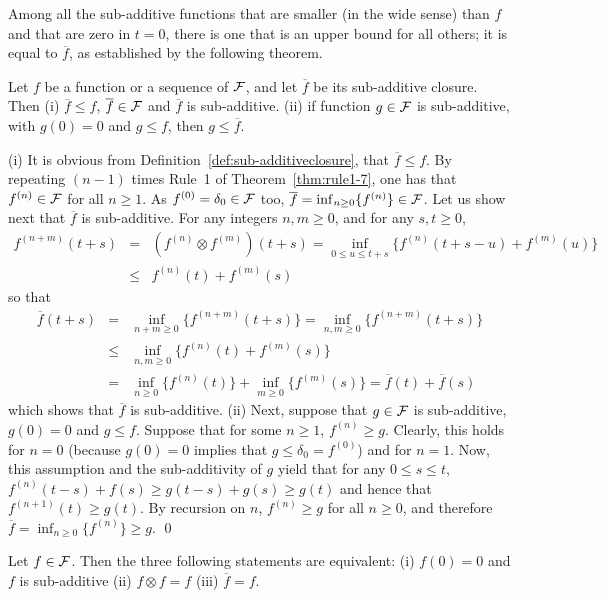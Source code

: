 Among all the sub-additive functions that are smaller (in the wide sense) than $f$ and
that are zero in $t=0$, there is one that is an upper bound for
all others; it is equal to $\overline{f}$, as established by the
following theorem.
\begin{theorem}
Let $f$ be a function or a sequence of $\mathcal F$, and let $\overline{f}$ be its sub-additive closure.
Then
\noindent
(i)  $\overline{f} \leq f$, $\overline{f} \in \mathcal F$ and $\overline{f}$ is sub-additive.
\noindent
(ii) if function $g \in \mathcal F$ is sub-additive, with $g(0) = 0$ and $g \leq f$, then $g \leq \overline{f}$.
\end{theorem}
\pr (i) It is obvious from Definition~\ref{def:sub-additiveclosure}, that $\overline{f} \leq f$. By repeating
$(n-1)$ times Rule~1 of Theorem~\ref{thm:rule1-7}, one has that $f^{(n)} \in \mathcal F$ for all $n \geq 1$.
As $f^{(0)}  = \delta_0 \in \mathcal F$ too, $\overline{f} = \inf_{n \geq 0} \{ f^{(n)} \} \in \mathcal F$.
Let us show next that $\overline{f}$ is sub-additive. For any integers $n,m \geq 0$, and for any $s,t \geq 0$,
\begin{eqnarray*}
f^{(n+m)}(t+s) & = & (f^{(n)} \otimes f^{(m)})(t+s) = \inf_{0 \leq u \leq t+s} \{ f^{(n)}(t+s-u) + f^{(m)}(u) \}\\
        & \leq & f^{(n)}(t) + f^{(m)}(s)
\end{eqnarray*}
so that
\begin{eqnarray*}
\overline{f}(t+s) & = & \inf_{n+m\geq 0} \{ f^{(n+m)}(t+s) \} = \inf_{n,m\geq 0} \{ f^{(n+m)}(t+s) \}  \\
            & \leq & \inf_{n,m\geq 0} \{ f^{(n)}(t) + f^{(m)}(s) \} \\
        & = & \inf_{n\geq 0} \{ f^{(n)}(t) \} +
            \inf_{m \geq 0} \{f^{(m)}(s) \} = \overline{f}(t) + \overline{f}(s)
\end{eqnarray*}
which shows that $\overline{f}$ is sub-additive.
(ii) Next, suppose that $g \in \mathcal F$ is sub-additive, $g(0) = 0$ and $g \leq f$.
Suppose that for some $n \geq 1$,  $f^{(n)} \geq g$.
Clearly, this holds for $n = 0$ (because $g(0) = 0$ implies that $g \leq \delta_0 = f^{(0)}$) and for $n =1$.
Now, this assumption and the sub-additivity of $g$ yield that for any $0 \leq s \leq t$,
$f^{(n)}(t-s) + f(s) \geq g(t-s) + g(s) \geq g(t)$ and hence that $f^{(n+1)}(t) \geq g(t)$.
By recursion on $n$, $f^{(n)} \geq g$  for all $n \geq 0$, and therefore $\overline{f} = \inf_{n \geq 0} \{ f^{(n)} \}
 \geq g$.
\qed
\begin{corollary}
Let $f \in \mathcal F$. Then the three following statements are equivalent:
(i) $f(0)=0$ and $f$ is sub-additive
(ii) $f \otimes f = f$
(iii) $\overline{f} = f$.
\end{corollary}
